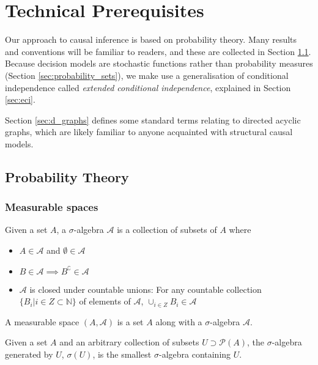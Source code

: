 
\section{Technical Prerequisites}\label{sec:tech_prereq}

Our approach to causal inference is based on probability theory. Many results and conventions will be familiar to readers, and these are collected in Section \ref{sec:standard_prob}. Because decision models are stochastic functions rather than probability measures (Section \ref{sec:probability_sets}), we make use a generalisation of conditional independence called \emph{extended conditional independence}, explained in Section \ref{sec:eci}.

Section \ref{sec:d_graphs} defines some standard terms relating to directed acyclic graphs, which are likely familiar to anyone acquainted with structural causal models.

\subsection{Probability Theory}\label{sec:standard_prob}

\subsubsection{Measurable spaces}

\begin{definition}
Given a set $A$, a $\sigma$-algebra $\mathcal{A}$ is a collection of subsets of $A$ where
\begin{itemize}
	\item $A\in \mathcal{A}$ and $\emptyset\in \mathcal{A}$
	\item $B\in \mathcal{A}\implies B^{\complement}\in\mathcal{A}$
	\item $\mathcal{A}$ is closed under countable unions: For any countable collection $\{B_i|i\in Z\subset \mathbb{N}\}$ of elements of $\mathcal{A}$, $\cup_{i\in Z}B_i\in \mathcal{A}$ 
\end{itemize}
\end{definition}

\begin{definition}
A measurable space $(A,\mathcal{A})$ is a set $A$ along with a $\sigma$-algebra $\mathcal{A}$.
\end{definition}

\begin{definition}
Given a set $A$ and an arbitrary collection of subsets $U\supset\mathscr{P}(A)$, the $\sigma$-algebra generated by $U$, $\sigma(U)$, is the smallest $\sigma$-algebra containing $U$.
\end{definition}

